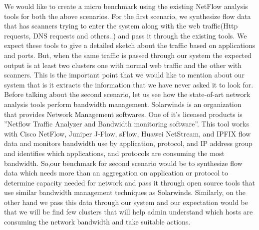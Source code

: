 We would like to create a micro benchmark using the existing NetFlow analysis tools
for both the above scenarios. For the first scenario, we synthesize flow data that has
scanners trying to enter the system along with the web traffic(Http requests, DNS requests
and others..) and pass it through the existing tools. We expect these tools to give a detailed
sketch about the traffic based on applications and ports. But, when the same traffic is
passed through our system the expected output is at least two clusters one with normal
web traffic and the other with scanners. This is the important point that we would like to
mention about our system that is it extracts the information that we have never asked it to
look for.
Before talking about the second scenario, let us see how the state-of-art network analysis
tools perform bandwidth management. Solarwinds is an organization that provides
Network Management softwares. One of it’s licensed products is ”Netflow Traffic Analyzer
and Bandwidth monitoring software”. This tool works with Cisco NetFlow, Juniper
J-Flow, sFlow, Huawei NetStream, and IPFIX flow data and monitors bandwidth use by
application, protocol, and IP address group and identifies which applications, and protocols
are consuming the most bandwidth. So,our benchmark for second scenario would be
to synthesize flow data which needs more than an aggregation on application or protocol
to determine capacity needed for network and pass it through open source tools that use
similar bandwidth management techniques as Solarwinds. Similarly, on the other hand
we pass this data through our system and our expectation would be that we will be find
few clusters that will help admin understand which hosts are consuming the network
bandwidth and take suitable actions.